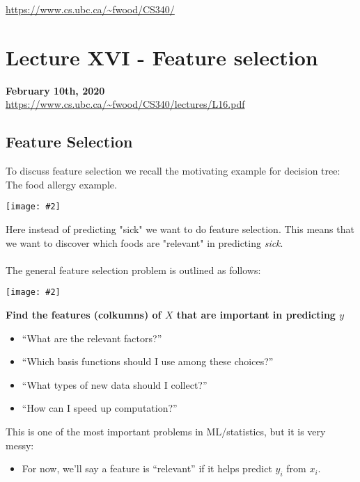 \documentclass{article}
\def\blu#1{{\color{blu}#1}}
\def\gre#1{{\color{gre}#1}}
\theoremstyle{definition}
\newcommand{\centerfig}[2]{\begin{center}\texttt{[image: \#2]}\end{center}}
\begin{document}
\noindent \url{https://www.cs.ubc.ca/~fwood/CS340/}

\section*{Lecture XVI - Feature selection}
\textbf{February 10th, 2020} \\
\url{https://www.cs.ubc.ca/~fwood/CS340/lectures/L16.pdf}

\subsection*{Feature Selection}
To discuss feature selection we recall the motivating example for decision tree: The food allergy example. 

\centerfig{0.75}{food-allergies}
Here instead of predicting "sick" we want to do feature selection. This means that we want to discover \blu{which foods are "relevant" in predicting \textit{sick}}. \\ \\
The general feature selection problem is outlined as follows:
\centerfig{0.50}{feature-sel1}
\textbf{\gre{Find the features (colkumns) of $ X $ that are important in predicting $ y $}}
\begin{itemize}
	\item “What are the relevant factors?”
	\item “Which basis functions should I use among these choices?”
	\item “What types of new data should I collect?”
	\item “How can I speed up computation?”
\end{itemize}
This is one of the most important problems in ML/statistics, but it is very messy:
\begin{itemize}
	\item For now, we’ll say a feature is “relevant” if it helps \blu{predict $ y_i $ from $ x_i $}.
\end{itemize}
\end{document}
